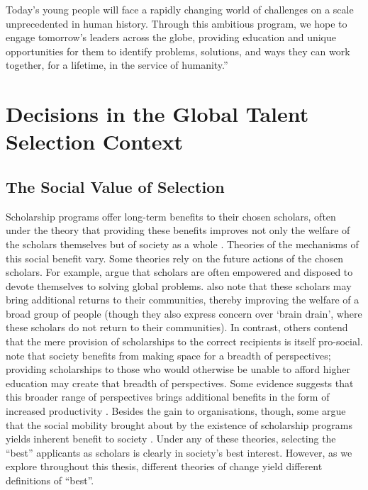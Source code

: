 \begin{savequote}[8cm]
Today’s young people will face a rapidly changing world of challenges on a scale unprecedented in human history. Through this ambitious program, we hope to engage tomorrow’s leaders across the globe, providing education and unique opportunities for them to identify problems, solutions, and ways they can work together, for a lifetime, in the service of humanity.”
\end{savequote}

\chapter{\label{ch:context}Decisions in the Global Talent Selection Context}
\minitoc

\section{The Social Value of Selection}\label{sec:social_value}
Scholarship programs offer long-term benefits to their chosen scholars, often under the theory that providing these benefits improves not only the welfare of the scholars themselves but of society as a whole \cite{DilraboJonbekova_Ruby_2023,Dassin_Marsh_Mawer_2018}. Theories of the mechanisms of this social benefit vary. Some theories rely on the future actions of the chosen scholars. For example, \textcite{Dassin_Marsh_Mawer_2018} argue that scholars are often empowered and disposed to devote themselves to solving global problems. \textcite{Dassin_Marsh_Mawer_2018} also note that these scholars may bring additional returns to their communities, thereby improving the welfare of a broad group of people (though they also express concern over `brain drain', where these scholars do not return to their communities). In contrast, others contend that the mere provision of scholarships to the correct recipients is itself pro-social. \textcite{minkin2023diversity} note that society benefits from making space for a breadth of perspectives; providing scholarships to those who would otherwise be unable to afford higher education may create that breadth of perspectives. Some evidence suggests that this broader range of perspectives brings additional benefits in the form of increased productivity \cite{autor2008does,noray2023systemic}. Besides the gain to organisations, though, some argue that the social mobility brought about by the existence of scholarship programs yields inherent benefit to society \cite{Dassin_Marsh_Mawer_2018}. Under any of these theories, selecting the ``best'' applicants as scholars is clearly in society's best interest. However, as we explore throughout this thesis, different theories of change yield different definitions of ``best''.

